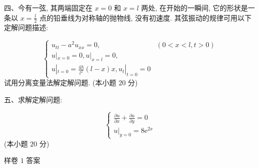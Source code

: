 \documentclass{article}
\theoremstyle{nonumberplain}
\newcommand{\ee}{\mathrm{e}}
\begin{document}
    \begin{flushleft}
    	四、今有一弦, 其两端固定在 $x=0$ 和 $x=l$ 两处, 在开始的一瞬间, 它的形状是一条以 $x=\frac{l}{2}$ 点的铅垂线为对称轴的抛物线, 没有初速度. 其弦振动的规律可用以下定解问题描述:
    \end{flushleft}
    \begin{equation*}
    	\begin{cases}
    	u_{tt}-a^2 u_{xx}=0, & (0<x<l,t>0)\\
    	u|_{x=0}=0,u|_{x=l}=0,\\
    	u|_{t=0}=\frac{4h}{l^2}(l-x)x,u_{t}|_{t=0}=0
    	\end{cases}
    \end{equation*}
    试用分离变量法解定解问题. (本小题 $20$ 分)
    
    \begin{flushleft}
    	五、求解定解问题:
    \end{flushleft}
    \begin{equation*}
    	\begin{cases}
    	\frac{\partial u}{\partial x}+\frac{\partial u}{\partial y}=0\\
    	u|_{y=0}=8\ee^{2x}
    	\end{cases}
    \end{equation*}(本小题 $20$ 分)
    \newpage
    \begin{center}
    	 样卷 $1$ 答案
    \end{center}
    
\end{document}
